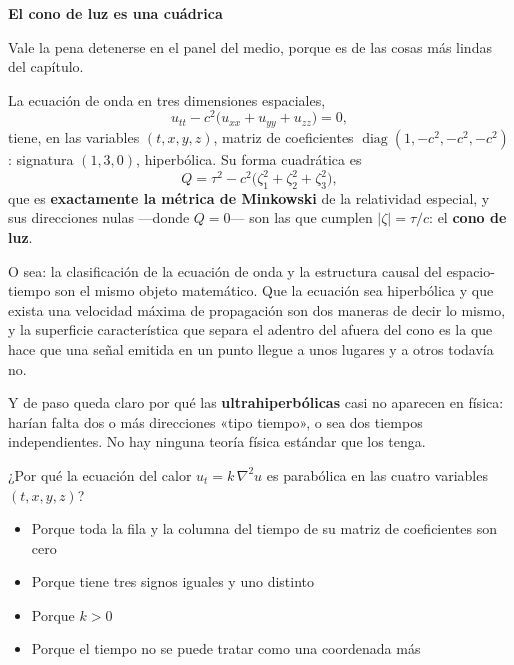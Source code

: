 \documentclass[
  spanish,
  a4paper,
]{scrbook}
\providecommand{\tightlist}{%
  \setlength{\itemsep}{0pt}\setlength{\parskip}{0pt}}
\theoremstyle{definition}
\theoremstyle{plain}
\theoremstyle{definition}
\theoremstyle{plain}
\theoremstyle{definition}
\theoremstyle{remark}
\begin{document}
\begin{tcolorbox}[enhanced jigsaw, arc=.35mm, bottomrule=.15mm, breakable, colback=white, colframe=quarto-callout-important-color-frame, left=2mm, leftrule=.75mm, opacityback=0, rightrule=.15mm, toprule=.15mm]
\begin{minipage}[t]{5.5mm}
\textcolor{quarto-callout-important-color}{\faExclamation}
\end{minipage}%
\begin{minipage}[t]{\textwidth - 5.5mm}

\vspace{-3mm}\textbf{El cono de luz es una cuádrica}\vspace{3mm}

Vale la pena detenerse en el panel del medio, porque es de las cosas más
lindas del capítulo.

La ecuación de onda en tres dimensiones espaciales,
\[u_{tt} - c^2\big(u_{xx}+u_{yy}+u_{zz}\big) = 0,\] tiene, en las
variables \((t,x,y,z)\), matriz de coeficientes
\(\operatorname{diag}(1,-c^2,-c^2,-c^2)\): signatura \((1,3,0)\),
hiperbólica. Su forma cuadrática es
\[Q = \tau^2 - c^2\big(\zeta_1^2+\zeta_2^2+\zeta_3^2\big),\] que es
\textbf{exactamente la métrica de Minkowski} de la relatividad especial,
y sus direcciones nulas ---donde \(Q=0\)--- son las que cumplen
\(|\zeta| = \tau/c\): el \textbf{cono de luz}.

O sea: la clasificación de la ecuación de onda y la estructura causal
del espacio-tiempo son el mismo objeto matemático. Que la ecuación sea
hiperbólica y que exista una velocidad máxima de propagación son dos
maneras de decir lo mismo, y la superficie característica que separa el
adentro del afuera del cono es la que hace que una señal emitida en un
punto llegue a unos lugares y a otros todavía no.

Y de paso queda claro por qué las \textbf{ultrahiperbólicas} casi no
aparecen en física: harían falta dos o más direcciones «tipo tiempo», o
sea dos tiempos independientes. No hay ninguna teoría física estándar
que los tenga.

\end{minipage}%
\end{tcolorbox}

¿Por qué la ecuación del calor \(u_t = k\,\nabla^2 u\) es parabólica en
las cuatro variables \((t,x,y,z)\)?

\begin{itemize}
\tightlist
\item
  {Porque toda la fila y la columna del tiempo de su matriz de
  coeficientes son cero}
\item
  {Porque tiene tres signos iguales y uno distinto}
\item
  {Porque \(k>0\)}
\item
  {Porque el tiempo no se puede tratar como una coordenada más}
\end{itemize}
\end{document}
